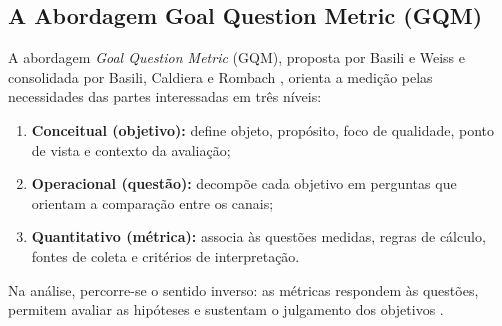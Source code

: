 \subsection{A Abordagem Goal Question Metric (GQM)}
\label{subsec:gqm}

A abordagem \textit{Goal Question Metric} (GQM), proposta por Basili e Weiss \cite{basili1984methodology} e consolidada por Basili, Caldiera e Rombach \cite{basili1994gqm}, orienta a medição pelas necessidades das partes interessadas em três níveis:

\begin{enumerate}
    \item \textbf{Conceitual (objetivo):} define objeto, propósito, foco de qualidade, ponto de vista e contexto da avaliação;
    \item \textbf{Operacional (questão):} decompõe cada objetivo em perguntas que orientam a comparação entre os canais;
    \item \textbf{Quantitativo (métrica):} associa às questões medidas, regras de cálculo, fontes de coleta e critérios de interpretação.
\end{enumerate}

Na análise, percorre-se o sentido inverso: as métricas respondem às questões, permitem avaliar as hipóteses e sustentam o julgamento dos objetivos \cite{van1999goal}.

